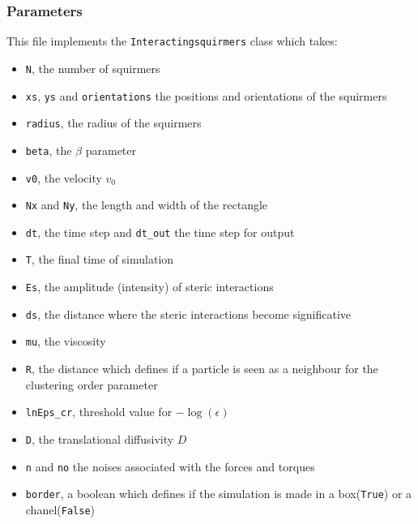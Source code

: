 \documentclass{article}
\begin{document}
\subsubsection*{Parameters}
This file implements the \texttt{Interactingsquirmers} class which takes:
\begin{itemize}
   \item \texttt{N}, the number of squirmers
   \item \texttt{xs}, \texttt{ys} and \texttt{orientations} the positions and orientations of the squirmers
   \item \texttt{radius}, the radius of the squirmers
   \item \texttt{beta}, the $\beta$ parameter
   \item \texttt{v0}, the velocity $v_0$
   \item \texttt{Nx} and \texttt{Ny}, the length and width of the rectangle
   \item \texttt{dt}, the time step and \texttt{dt\_out} the time step for output
   \item \texttt{T}, the final time of simulation
   \item \texttt{Es}, the amplitude (intensity) of steric interactions
   \item \texttt{ds}, the distance where the steric interactions become significative
   \item \texttt{mu}, the viscosity
   \item \texttt{R}, the distance which defines if a particle is seen as a neighbour for the clustering order parameter
   \item \texttt{lnEps\_cr}, threshold value for \( -\log(\epsilon) \)
   \item \texttt{D}, the translational diffusivity $D$
   \item \texttt{n} and \texttt{no} the noises associated with the forces and torques
   \item \texttt{border}, a boolean which defines if the simulation is made in a box(\texttt{True}) or a chanel(\texttt{False})
\end{itemize}
\end{document}
